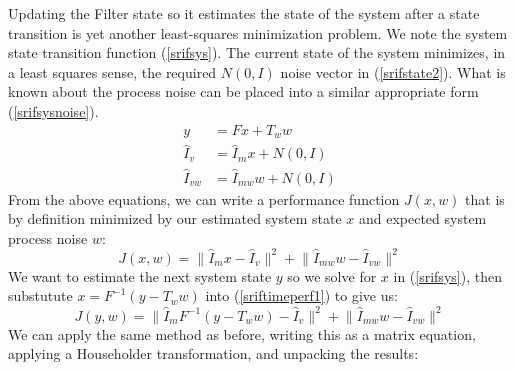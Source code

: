 Updating the Filter state so it estimates the state
of the system after a state transition
is yet another least-squares minimization problem.
We note the system state transition function (\ref{srifsys}).
The current state of the system minimizes,
in a least squares sense,
the required $N(0,I)$ noise vector in (\ref{srifstate2}).
What is known about the process noise can be placed
into a similar appropriate form (\ref{srifsysnoise}).
\begin{subequations}
\begin{align}
   y & = F x + T_w w                                 \label{srifsys}
\\ {\hat I}_v    & = {\hat I}_m   x + N(0,I)   \label{srifstate2}
\\ {\hat I}_{vw} & = {\hat I}_{mw} w + N(0,I)   \label{srifsysnoise}
\end{align}
\end{subequations}
From the above equations,
we can write a performance function $J(x,w)$
that is by definition minimized by our
estimated system state $x$ and
expected system process noise $w$:
\begin{equation}
J(x,w) =  \lVert {\hat I}_m    x  -  {\hat I}_v    \rVert ^ 2
       +  \lVert {\hat I}_{mw} w  -  {\hat I}_{vw} \rVert ^ 2
\label{sriftimeperf1}
\end{equation}
We want to estimate the next system state $y$
so we solve for $x$ in (\ref{srifsys}), then substutute
$x = F^{-1} \left( y - T_w w \right)$ into (\ref{sriftimeperf1})
to give us:
\begin{equation}
J(y,w) =  \lVert {\hat I}_m F^{-1} \left( y - T_w w \right) -
                 {\hat I}_v                       \rVert ^ 2
       +  \lVert {\hat I}_{mw} w -  {\hat I}_{vw} \rVert ^ 2
\label{sriftimeperf2}
\end{equation}
We can apply the same method as before,
writing this as a matrix equation,
applying a Householder transformation,
and unpacking the results:
